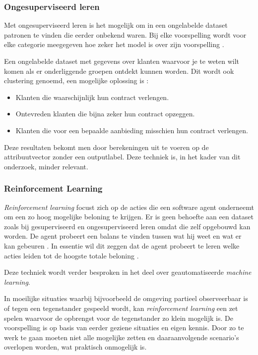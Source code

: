\subsubsection{Ongesuperviseerd leren}
\label{subsubsec:ongesuperviseerd-leren}

Met ongesuperviseerd leren is het mogelijk om in een ongelabelde dataset patronen te vinden die eerder onbekend waren. Bij elke voorspelling wordt voor elke categorie meegegeven hoe zeker het model is over zijn voorspelling \autocite{Hinton1999}.

Een ongelabelde dataset met gegevens over klanten waarvoor je te weten wilt komen als er onderliggende groepen ontdekt kunnen worden. Dit wordt ook clustering genoemd, een mogelijke oplossing is \autocite{Lievens2019}:

\begin{itemize}
    \item Klanten die waarschijnlijk hun contract verlengen.
    \item Ontevreden klanten die bijna zeker hun contract opzeggen.
    \item Klanten die voor een bepaalde aanbieding misschien hun contract verlengen.
\end{itemize}

Deze resultaten bekomt men door berekeningen uit te voeren op de attribuutvector zonder een outputlabel. Deze techniek is, in het kader van dit onderzoek, minder relevant.

\subsubsection{Reinforcement Learning}
\label{subsubsec:reinforcement-learning}

\textit{Reinforcement learning} focust zich op de acties die een software agent onderneemt om een zo hoog mogelijke beloning te krijgen. Er is geen behoefte aan een dataset zoals bij gesuperviseerd en ongesuperviseerd leren omdat die zelf opgebouwd kan worden. De agent probeert een balans te vinden tussen wat hij weet en wat er kan gebeuren \autocite{Kaelbling1996}. In essentie wil dit zeggen dat de agent probeert te leren welke acties leiden tot de hoogste totale beloning \autocite{Lievens2019}.

Deze techniek wordt verder besproken in het deel over geautomatiseerde \textit{machine learning}.

In moeilijke situaties waarbij bijvoorbeeld de omgeving partieel observeerbaar is of tegen een tegenstander gespeeld wordt, kan \textit{reinforcement learning} een zet spelen waarvoor de opbrengst voor de tegenstander zo klein mogelijk is. De voorspelling is op basis van eerder geziene situaties en eigen kennis. Door zo te werk te gaan moeten niet alle mogelijke zetten en daaraanvolgende scenario's overlopen worden, wat praktisch onmogelijk is.

